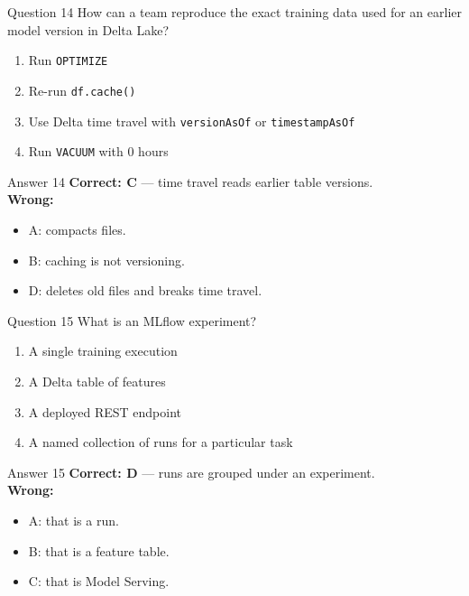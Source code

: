 \documentclass[aspectratio=169,11pt]{beamer}
\begin{document}
	\begin{frame}{Question 14}
		How can a team reproduce the exact training data used for an earlier model version in Delta Lake?
		\begin{enumerate}[label=\Alph*.]
			\item Run \texttt{OPTIMIZE}
			\item Re-run \texttt{df.cache()}
			\item Use Delta time travel with \texttt{versionAsOf} or \texttt{timestampAsOf}
			\item Run \texttt{VACUUM} with 0 hours
		\end{enumerate}
	\end{frame}
	\begin{frame}{Answer 14}
		\textbf{Correct: C} --- time travel reads earlier table versions.\\
		\vspace{0.5em}
		\textbf{Wrong:}
		\begin{itemize}
			\item A: compacts files.
			\item B: caching is not versioning.
			\item D: deletes old files and breaks time travel.
		\end{itemize}
	\end{frame}
	
	\begin{frame}{Question 15}
		What is an MLflow experiment?
		\begin{enumerate}[label=\Alph*.]
			\item A single training execution
			\item A Delta table of features
			\item A deployed REST endpoint
			\item A named collection of runs for a particular task
		\end{enumerate}
	\end{frame}
	\begin{frame}{Answer 15}
		\textbf{Correct: D} --- runs are grouped under an experiment.\\
		\vspace{0.5em}
		\textbf{Wrong:}
		\begin{itemize}
			\item A: that is a run.
			\item B: that is a feature table.
			\item C: that is Model Serving.
		\end{itemize}
	\end{frame}
	
\end{document}
